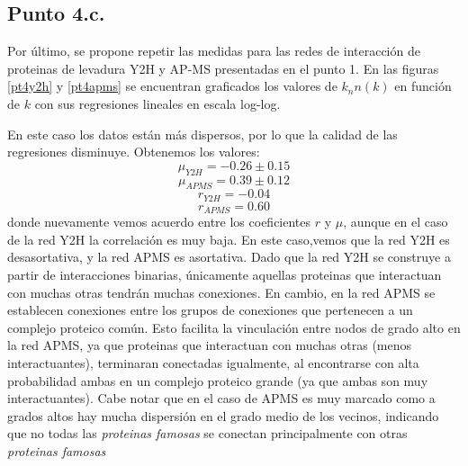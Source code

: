 \documentclass{article}
\begin{document}
\subsection{Punto 4.c.}
Por último, se propone repetir las medidas para las redes de interacción de proteinas de levadura Y2H y AP-MS presentadas en el punto 1. En las figuras \ref{pt4y2h} y \ref{pt4apms} se encuentran graficados los valores de $k_nn(k)$ en función de $k$ con sus regresiones lineales en escala log-log.

En este caso los datos están más dispersos, por lo que la calidad de las regresiones disminuye. Obtenemos los valores:
\begin{equation}
\mu_{Y2H} = -0.26 \pm 0.15
\end{equation}
\begin{equation}
\mu_{APMS} = 0.39 \pm 0.12 
\end{equation}
\begin{equation}
r_{Y2H} = -0.04
\end{equation}
\begin{equation}
r_{APMS} = 0.60 
\end{equation}
donde nuevamente vemos acuerdo entre los coeficientes $r$ y $\mu$, aunque en el caso de la red Y2H la correlación es muy baja. En este caso,vemos que la red Y2H es desasortativa, y la red APMS es asortativa. Dado que la red Y2H se construye a partir de interacciones binarias, únicamente aquellas proteinas que interactuan con muchas otras tendrán muchas conexiones. En cambio, en la red APMS se establecen conexiones entre los grupos de conexiones que pertenecen a un complejo proteico común. Esto facilita la vinculación entre nodos de grado alto en la red APMS, ya que proteinas que interactuan con muchas otras (menos interactuantes), terminaran conectadas igualmente, al encontrarse con alta probabilidad ambas en un complejo proteico grande (ya que ambas son muy interactuantes). Cabe notar que en el caso de APMS es muy marcado como a grados altos hay mucha dispersión en el grado medio de los vecinos, indicando que no todas las \textit{proteinas famosas} se conectan principalmente con otras \textit{proteinas famosas}
\end{document}

